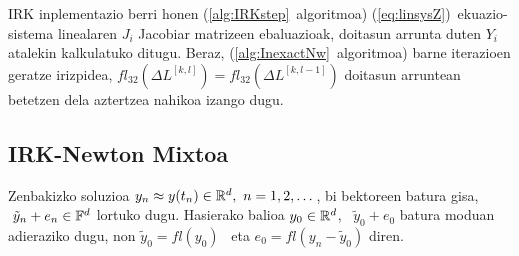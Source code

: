 IRK inplementazio berri honen (\ref{alg:IRKstep}~algoritmoa) (\ref{eq:linsysZ})~ekuazio-sistema linealaren  $J_i$ Jacobiar matrizeen ebaluazioak, doitasun arrunta duten $Y_i$ atalekin kalkulatuko ditugu. Beraz, (\ref{alg:InexactNw}~algoritmoa) barne iterazioen geratze irizpidea, $fl_{32}(\Delta L^{[k,l]})=fl_{32}(\Delta L^{[k,l-1]})$ doitasun arruntean betetzen dela aztertzea nahikoa izango dugu.  

\subsection{IRK-Newton Mixtoa}
\label{ss:ss762}

Zenbakizko soluzioa $y_n \approx y(t_n) \in \mathbb{R}^{d}, \ n=1,2,\dots$, bi bektoreen batura gisa, $ \ \tilde{y}_n+e_n \in \mathbb{F}^{d}$ lortuko dugu. Hasierako balioa $y_0 \in \mathbb{R}^{d}$, \ $\tilde{y}_0+e_0$ batura moduan adieraziko dugu, non $\tilde{y}_0=fl(y_0)$~ eta $e_0=fl(y_n-\tilde{y}_0)$ diren. 

